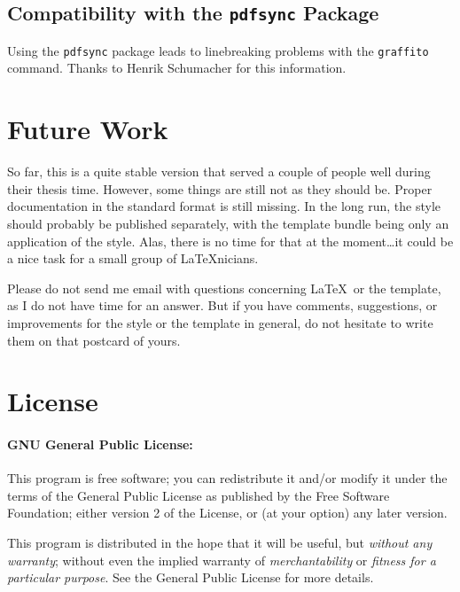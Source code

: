 \subsection*{Compatibility with the \texttt{pdfsync} Package}
Using the \texttt{pdfsync} package leads to linebreaking problems with the \texttt{graffito} command. Thanks to Henrik Schumacher for this information. 


\section{Future Work}
So far, this is a quite stable version that served a couple of people well during their thesis time. However, some things are still not as they should be. Proper documentation in the standard format is still missing. In the long run, the style should probably be published separately, with the template bundle being only an application of the style. Alas, there is no time for that at the moment\dots it could be a nice task for a small group of \LaTeX nicians.

Please do not send me email with questions concerning \LaTeX\ or the template, as I do not have time for an answer. But if you have comments, suggestions, or improvements for the style or the template in general, do not hesitate to write them on that postcard of yours.


\section{License}
\paragraph{GNU General Public License:} This program is free software; you can redistribute it and/or modify it under the terms of the  General Public License as published by the Free Software Foundation; either version 2 of the License, or (at your option) any later version.

This program is distributed in the hope that it will be useful, but \emph{without any warranty}; without even the implied warranty of \emph{merchantability} or \emph{fitness for a particular purpose}. See the  General Public License for more details.